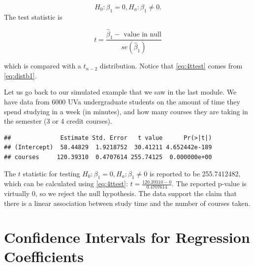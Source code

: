 \documentclass[
]{book}
\newenvironment{Shaded}{\begin{snugshade}}{\end{snugshade}}
\newcommand{\AttributeTok}[1]{\textcolor[rgb]{0.13,0.29,0.53}{#1}}
\newcommand{\DocumentationTok}[1]{\textcolor[rgb]{0.56,0.35,0.01}{\textbf{\textit{#1}}}}
\newcommand{\FunctionTok}[1]{\textcolor[rgb]{0.13,0.29,0.53}{\textbf{#1}}}
\newcommand{\NormalTok}[1]{#1}
\newcommand{\OtherTok}[1]{\textcolor[rgb]{0.56,0.35,0.01}{#1}}
\newcommand{\SpecialCharTok}[1]{\textcolor[rgb]{0.81,0.36,0.00}{\textbf{#1}}}
\begin{document}
\[
H_0: \beta_1 = 0, H_a: \beta_1 \neq 0.
\]
The test statistic is

\begin{equation} 
t = \frac{\hat{\beta}_1 - \text{ value in null}}{se(\hat{\beta}_1)}
\label{eq:4ttest}
\end{equation}

which is compared with a \(t_{n-2}\) distribution. Notice that \eqref{eq:4ttest} comes from \eqref{eq:distb1}.

Let us go back to our simulated example that we saw in the last module. We have data from 6000 UVa undergraduate students on the amount of time they spend studying in a week (in minutes), and how many courses they are taking in the semester (3 or 4 credit courses).

\begin{Shaded}
\end{Shaded}

\begin{verbatim}
##              Estimate Std. Error   t value      Pr(>|t|)
## (Intercept)  58.44829  1.9218752  30.41211 4.652442e-189
## courses     120.39310  0.4707614 255.74125  0.000000e+00
\end{verbatim}

The \(t\) statistic for testing \(H_0: \beta_1 = 0, H_a: \beta_1 \neq 0\) is reported to be 255.7412482, which can be calculated using \eqref{eq:4ttest}: \(t= \frac{120.39310 - 0}{0.4707614}\). The reported p-value is virtually 0, so we reject the null hypothesis. The data support the claim that there is a linear association between study time and the number of courses taken.

\hypertarget{confidence-intervals-for-regression-coefficients}{%
\section{Confidence Intervals for Regression Coefficients}\label{confidence-intervals-for-regression-coefficients}}
\end{document}
